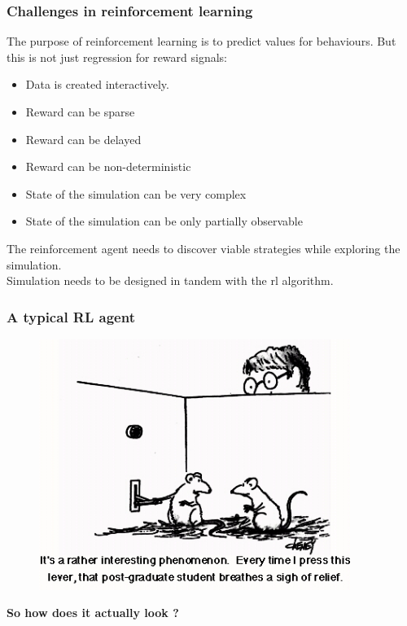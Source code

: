 \documentclass{beamer}
\begin{document}
\begin{frame}
\frametitle{Challenges in reinforcement learning}
The purpose of reinforcement learning is to predict values for behaviours.
But this is not just regression for reward signals:
\begin{itemize}
\item Data is created interactively.
\item Reward can be sparse
\item Reward can be delayed
\item Reward can be non-deterministic
\item State of the simulation can be very complex
\item State of the simulation can be only partially observable
\end{itemize}
\bigskip

The reinforcement agent needs to discover viable strategies while exploring the simulation.\\
\textrightarrow  Simulation needs to be designed in tandem with the rl algorithm.
\end{frame}

\begin{frame}
\frametitle{A typical RL agent}
\begin{figure}
\includegraphics[width=0.9\textwidth]{rat_cartoon.jpg}
\end{figure}
\end{frame}

\begin{frame}
\begin{center}
\textbf{So how does it actually look ?}
\end{center}
\end{frame}
\end{document}
